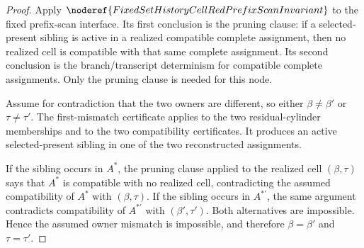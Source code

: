 \begin{proof}
Apply \(\noderef{FixedSetHistoryCellRedPrefixScanInvariant}\) to the fixed
prefix-scan interface.  Its first conclusion is the pruning clause: if a
selected-present sibling is active in a realized compatible complete
assignment, then no realized cell is compatible with that same complete
assignment.  Its second conclusion is the branch/transcript determinism for
compatible complete assignments.  Only the pruning clause is needed for
this node.

Assume for contradiction that the two owners are different, so either
\(\beta\ne\beta'\) or \(\tau\ne\tau'\).  The first-mismatch certificate
applies to the two residual-cylinder memberships and to the two
compatibility certificates.  It produces an active selected-present sibling
in one of the two reconstructed assignments.

If the sibling occurs in \(A^\ast\), the pruning clause applied to the
realized cell \((\beta,\tau)\) says that \(A^\ast\) is compatible with no
realized cell, contradicting the assumed compatibility of \(A^\ast\) with
\((\beta,\tau)\).  If the sibling occurs in \(A^{\ast\prime}\), the same
argument contradicts compatibility of \(A^{\ast\prime}\) with
\((\beta',\tau')\).  Both alternatives are impossible.  Hence the assumed
owner mismatch is impossible, and therefore \(\beta=\beta'\) and
\(\tau=\tau'\).
\end{proof}
